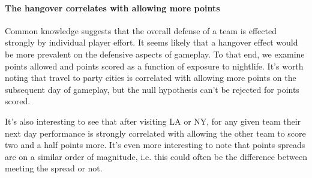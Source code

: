 \documentclass[letterpaper,12pt]{article}
\begin{document}
\paragraph{The hangover correlates with allowing more points}
Common knowledge suggests that the overall defense of a team
is effected strongly by individual player effort. It seems likely that a hangover effect
would be more prevalent on the defensive aspects of gameplay. To that end, we examine points allowed and points scored as a function of exposure to nightlife.
It's worth noting that travel to party cities is correlated with allowing
more points on the subsequent day of gameplay, but the null hypothesis
can't be rejected for points scored.

It's also interesting to see that after visiting LA or NY, for any given
team their next day performance is strongly correlated with allowing the other team to score two and a half points more. 
It's even more interesting to note that points spreads are on a similar order of magnitude, i.e. this could often be the difference between meeting the spread or not.
\end{document}
